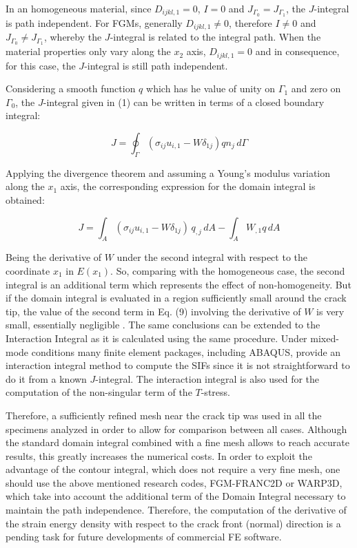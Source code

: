 In an homogeneous material, since $D_{ijkl,1}=0$, $I=0$ and $J_{\Gamma_0}=J_{\Gamma_1}$, the $J$-integral is path independent. For FGMs, generally $D_{ijkl,1} \neq 0$, therefore $I \neq 0$ and $J_{\Gamma_0}\neq J_{\Gamma_1}$, whereby the $J$-integral is related to the integral path. When the material properties only vary along the $x_2$ axis, $D_{ijkl,1}=0$ and in consequence, for this case, the $J$-integral is still path independent.

Considering a smooth function $q$ which has he value of unity on $\Gamma_1$ and zero on $\Gamma_0$, the $J$-integral given in (1) can be written in terms of a closed boundary integral:

\begin{equation}
J = \oint_{\Gamma} (\sigma_{ij}u_{i,1} - W \delta_{1j})q n_j \,d\Gamma
\end{equation}

Applying the divergence theorem and assuming a Young's modulus variation along the $x_1$ axis, the corresponding expression for the domain integral is obtained:

\begin{equation}
J = \int_A (\sigma_{ij}u_{i,1} - W \delta_{1j})\,q_{,j}\,dA - \int_A W_{,1} q \, dA
\end{equation}

Being the derivative of $W$ under the second integral with respect to the coordinate $x_1$ in $E(x_1)$. So, comparing with the homogeneous case, the second integral is an additional term which represents the effect of non-homogeneity. But if the domain integral is evaluated in a region sufficiently small around the crack tip, the value of the second term in Eq. (9) involving the derivative of $W$ is very small, essentially negligible \citep{Gu1997}. The same conclusions can be extended to the Interaction Integral \citep{Shih1988} as it is calculated using the same procedure. Under mixed-mode conditions many finite element packages, including ABAQUS, provide an interaction integral method to compute the SIFs since it is not straightforward to do it from a known $J$-integral. The interaction integral is also used for the computation of the non-singular term of the $T$-stress.

Therefore, a sufficiently refined mesh near the crack tip was used in all the specimens analyzed in order to allow for comparison between all cases. Although the standard domain integral combined with a fine mesh allows to reach accurate results, this greatly increases the numerical costs. In order to exploit the advantage of the contour integral, which does not require a very fine mesh, one should use the above mentioned research codes, FGM-FRANC2D or WARP3D, which take into account the additional term of the Domain Integral necessary to maintain the path independence. Therefore, the computation of the derivative of the strain energy density with respect to the crack front (normal) direction is a pending task for future developments of commercial FE software.

